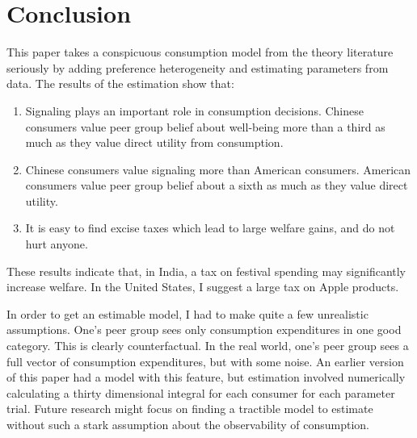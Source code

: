 \documentclass[12pt]{article}
\begin{document}
\section{Conclusion}
This paper takes a conspicuous consumption model from the theory literature seriously by adding preference heterogeneity and estimating parameters from data.
The results of the estimation show that:
\begin{enumerate}
    \item Signaling plays an important role in consumption decisions.  Chinese consumers value peer group belief about well-being more than a third as much as they value direct utility from consumption.
    \item Chinese consumers value signaling more than American consumers.  American consumers value peer group belief about a sixth as much as they value direct utility.
    \item It is easy to find excise taxes which lead to large welfare gains, and do not hurt anyone.
\end{enumerate}
	These results indicate that, in India, a tax on festival spending may significantly increase welfare.
In the United States, I suggest a large tax on Apple products.

In order to get an estimable model, I had to make quite a few unrealistic assumptions.
One's peer group sees only consumption expenditures in one good category. 
This is clearly counterfactual.
In the real world, one's peer group sees a full vector of consumption expenditures, but with some noise.
An earlier version of this paper had a model with this feature, but estimation involved numerically calculating a thirty dimensional integral for each consumer for each parameter trial.
Future research might focus on finding a tractible model to estimate without such a stark assumption about the observability of consumption.


\end{document}

